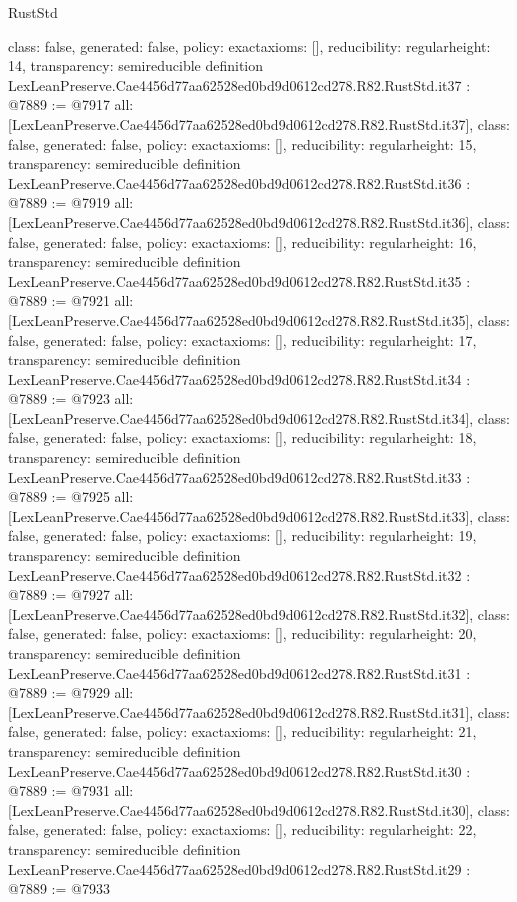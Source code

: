 \begin{lexlean}{RustStd}
\begin{coremodule}
{  class: false,
  generated: false,
  policy: exact{axioms: []},
  reducibility: regular{height: 14},
  transparency: semireducible
}
definition LexLeanPreserve.Cae4456d77aa62528ed0bd9d0612cd278.R82.RustStd.it37 : @7889 := @7917 {
  all: [LexLeanPreserve.Cae4456d77aa62528ed0bd9d0612cd278.R82.RustStd.it37],
  class: false,
  generated: false,
  policy: exact{axioms: []},
  reducibility: regular{height: 15},
  transparency: semireducible
}
definition LexLeanPreserve.Cae4456d77aa62528ed0bd9d0612cd278.R82.RustStd.it36 : @7889 := @7919 {
  all: [LexLeanPreserve.Cae4456d77aa62528ed0bd9d0612cd278.R82.RustStd.it36],
  class: false,
  generated: false,
  policy: exact{axioms: []},
  reducibility: regular{height: 16},
  transparency: semireducible
}
definition LexLeanPreserve.Cae4456d77aa62528ed0bd9d0612cd278.R82.RustStd.it35 : @7889 := @7921 {
  all: [LexLeanPreserve.Cae4456d77aa62528ed0bd9d0612cd278.R82.RustStd.it35],
  class: false,
  generated: false,
  policy: exact{axioms: []},
  reducibility: regular{height: 17},
  transparency: semireducible
}
definition LexLeanPreserve.Cae4456d77aa62528ed0bd9d0612cd278.R82.RustStd.it34 : @7889 := @7923 {
  all: [LexLeanPreserve.Cae4456d77aa62528ed0bd9d0612cd278.R82.RustStd.it34],
  class: false,
  generated: false,
  policy: exact{axioms: []},
  reducibility: regular{height: 18},
  transparency: semireducible
}
definition LexLeanPreserve.Cae4456d77aa62528ed0bd9d0612cd278.R82.RustStd.it33 : @7889 := @7925 {
  all: [LexLeanPreserve.Cae4456d77aa62528ed0bd9d0612cd278.R82.RustStd.it33],
  class: false,
  generated: false,
  policy: exact{axioms: []},
  reducibility: regular{height: 19},
  transparency: semireducible
}
definition LexLeanPreserve.Cae4456d77aa62528ed0bd9d0612cd278.R82.RustStd.it32 : @7889 := @7927 {
  all: [LexLeanPreserve.Cae4456d77aa62528ed0bd9d0612cd278.R82.RustStd.it32],
  class: false,
  generated: false,
  policy: exact{axioms: []},
  reducibility: regular{height: 20},
  transparency: semireducible
}
definition LexLeanPreserve.Cae4456d77aa62528ed0bd9d0612cd278.R82.RustStd.it31 : @7889 := @7929 {
  all: [LexLeanPreserve.Cae4456d77aa62528ed0bd9d0612cd278.R82.RustStd.it31],
  class: false,
  generated: false,
  policy: exact{axioms: []},
  reducibility: regular{height: 21},
  transparency: semireducible
}
definition LexLeanPreserve.Cae4456d77aa62528ed0bd9d0612cd278.R82.RustStd.it30 : @7889 := @7931 {
  all: [LexLeanPreserve.Cae4456d77aa62528ed0bd9d0612cd278.R82.RustStd.it30],
  class: false,
  generated: false,
  policy: exact{axioms: []},
  reducibility: regular{height: 22},
  transparency: semireducible
}
definition LexLeanPreserve.Cae4456d77aa62528ed0bd9d0612cd278.R82.RustStd.it29 : @7889 := @7933 {
}
\end{coremodule}
\end{lexlean}
